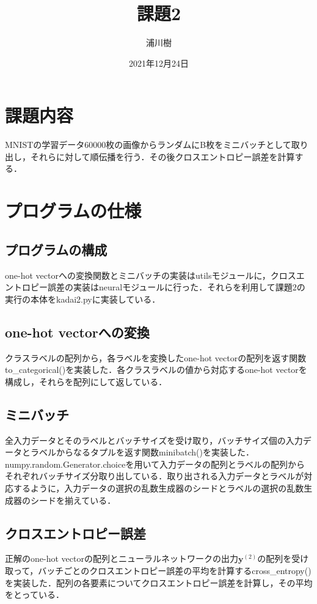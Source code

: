 \documentclass[uplatex]{jsarticle}
\begin{document}
    \title{課題2}
    \author{浦川樹}
    \date{2021年12月24日}
    \maketitle

    \section{課題内容}
    MNISTの学習データ60000枚の画像からランダムにB枚をミニバッチとして取り出し，それらに対して順伝播を行う．その後クロスエントロピー誤差を計算する．

    \section{プログラムの仕様}

    \subsection{プログラムの構成}
    one-hot vectorへの変換関数とミニバッチの実装はutilsモジュールに，クロスエントロピー誤差の実装はneuralモジュールに行った．それらを利用して課題2の実行の本体をkadai2.pyに実装している．

    \subsection{one-hot vectorへの変換}
    クラスラベルの配列から，各ラベルを変換したone-hot vectorの配列を返す関数to\_categorical()を実装した．各クラスラベルの値から対応するone-hot vectorを構成し，それらを配列にして返している．

    \subsection{ミニバッチ}
    全入力データとそのラベルとバッチサイズを受け取り，バッチサイズ個の入力データとラベルからなるタプルを返す関数minibatch()を実装した．numpy.random.Generator.choiceを用いて入力データの配列とラベルの配列からそれぞれバッチサイズ分取り出している．取り出される入力データとラベルが対応するように，入力データの選択の乱数生成器のシードとラベルの選択の乱数生成器のシードを揃えている．

    \subsection{クロスエントロピー誤差}
    正解のone-hot vectorの配列とニューラルネットワークの出力$\boldsymbol{y}^{(2)}$の配列を受け取って，バッチごとのクロスエントロピー誤差の平均を計算するcross\_entropy()を実装した．配列の各要素についてクロスエントロピー誤差を計算し，その平均をとっている．
\end{document}
